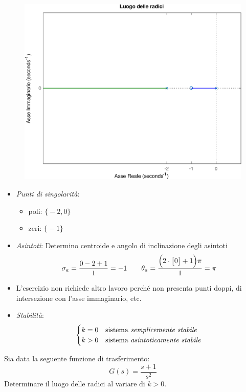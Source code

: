 \begin{figure}[ht]
	\centering
	\includegraphics[scale=.6]{mod1/assets/rl_ex31}
\end{figure}

\begin{itemize}
	\item \emph{Punti di singolarità}:
		\begin{itemize}
			\item poli: \(\bigl\{-2, 0\bigr\}\)
			\item zeri: \(\bigl\{-1\bigr\}\)
		\end{itemize}
	\item \emph{Asintoti}:
		Determino centroide e angolo di inclinazione degli asintoti
		\[
			\sigma_a = \frac{0 -2 +1}{1} = -1
			\qquad
			\theta_a = \frac{\Bigl(2\cdot\bigl[0\bigr]+1\Bigr)\pi}{1} = \pi
		\]
	\item L'esercizio non richiede altro lavoro perché non presenta punti doppi,
		di intersezione con l'asse immaginario, etc.
	\item \emph{Stabilità}:
		\[\begin{cases}
			k = 0 & \text{sistema \emph{semplicemente stabile}} \\
			k > 0 & \text{sistema \emph{asintoticamente stabile}} \\
		\end{cases}\]
\end{itemize}


\exercise{}
Sia data la seguente funzione di trasferimento:
\[
	G(s) = \frac{s+1}{s^2}
\]
Determinare il luogo delle radici al variare di \(k > 0\).

